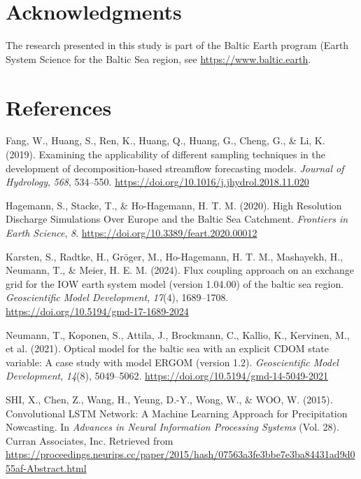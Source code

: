 \documentclass[
]{agujournal2019}
\newlength{\cslhangindent}
\newenvironment{CSLReferences}[2] %
 {\begin{list}{}{%
  \setlength{\itemindent}{0pt}
  \setlength{\leftmargin}{0pt}
  \setlength{\parsep}{0pt}
  \ifodd #1
   \setlength{\leftmargin}{\cslhangindent}
   \setlength{\itemindent}{-1\cslhangindent}
  \fi
  \setlength{\itemsep}{#2\baselineskip}}}
 {\end{list}}
\begin{document}
\section{Acknowledgments}\label{acknowledgments}

The research presented in this study is part of the Baltic Earth program
(Earth System Science for the Baltic Sea region, see
\href{https://www.baltic.earth/}{https://www.baltic.earth}.

\section*{References}\label{references}

\label{refs}
\begin{CSLReferences}{1}{0}
\vspace{1em}

Fang, W., Huang, S., Ren, K., Huang, Q., Huang, G., Cheng, G., \& Li, K.
(2019). Examining the applicability of different sampling techniques in
the development of decomposition-based streamflow forecasting models.
\emph{Journal of Hydrology}, \emph{568}, 534--550.
\url{https://doi.org/10.1016/j.jhydrol.2018.11.020}

Hagemann, S., Stacke, T., \& Ho-Hagemann, H. T. M. (2020). High
{Resolution Discharge Simulations Over Europe} and the {Baltic Sea
Catchment}. \emph{Frontiers in Earth Science}, \emph{8}.
\url{https://doi.org/10.3389/feart.2020.00012}

Karsten, S., Radtke, H., Gröger, M., Ho-Hagemann, H. T. M., Mashayekh,
H., Neumann, T., \& Meier, H. E. M. (2024). Flux coupling approach on an
exchange grid for the IOW earth system model (version 1.04.00) of the
baltic sea region. \emph{Geoscientific Model Development}, \emph{17}(4),
1689--1708. \url{https://doi.org/10.5194/gmd-17-1689-2024}

Neumann, T., Koponen, S., Attila, J., Brockmann, C., Kallio, K.,
Kervinen, M., et al. (2021). Optical model for the baltic sea with an
explicit CDOM state variable: A case study with model ERGOM (version
1.2). \emph{Geoscientific Model Development}, \emph{14}(8), 5049--5062.
\url{https://doi.org/10.5194/gmd-14-5049-2021}

SHI, X., Chen, Z., Wang, H., Yeung, D.-Y., Wong, W., \& WOO, W. (2015).
Convolutional {LSTM Network}: {A Machine Learning Approach} for
{Precipitation Nowcasting}. In \emph{Advances in {Neural Information
Processing Systems}} (Vol. 28). Curran Associates, Inc. Retrieved from
\url{https://proceedings.neurips.cc/paper/2015/hash/07563a3fe3bbe7e3ba84431ad9d055af-Abstract.html}


\end{CSLReferences}
\end{document}
